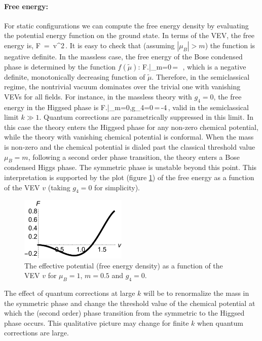  \paragraph{Free energy:} For static configurations  we can compute the free energy density by evaluating the potential energy function on the ground state.   In terms of the VEV, the free energy is,
 \be
F \,=\, v^2\,.
 \ee
 It is easy to check that (assuming $|\mu_B| > m$) the function is negative definite.
 In the massless case, the free energy of the Bose condensed phase is determined by the function $f(\tilde\mu)$:
 \be
 F\left.\right|_{m=0}\,=\, \,,
 \ee
 which is a negative definite, monotonically decreasing function of $\tilde\mu$. Therefore, in the semiclassical regime, the nontrivial vacuum dominates over the trivial one with vanishing VEVs for all fields. For instance, in the massless theory with $g_4=0$, the free energy in the Higgsed phase is
 \be
 F\left.\right|_{m=0,g_4=0}\,=\,-4\,,
 \ee
  valid in the semiclassical limit $k\gg 1$. Quantum corrections are parametrically suppressed in this limit. In this case the theory enters the Higgsed phase for any non-zero chemical potential, while the theory with vanishing chemical potential is conformal.   When the mass is non-zero and the chemical potential is dialed past the classical threshold value $\mu_B=m$, following a second order phase transition, the theory enters a Bose condensed Higgs phase.   The symmetric phase is unstable beyond this point. This interpretation is supported by the plot (figure \ref{fvsv}) of the free energy as a function of the VEV $v$ (taking $g_4=0$ for simplicity).
   \begin{figure}[h]
\begin{center}
\includegraphics[width=2in]{Chapter_3_Folder_1806.06976/figures/Fvsv.pdf}
\end{center}
       \caption[This figure shows the effective potential (free energy density) as a function of the VEV $v$ for $\mu_B=1$, $m=0.5$ and $g_4=0$.
]{ The effective potential (free energy density) as a function of the VEV $v$ for $\mu_B=1$, $m=0.5$ and $g_4=0$.
}
\label{fvsv}
\end{figure}
The effect of  quantum corrections at large $k$ will be to renormalize the mass  in the symmetric phase and change the threshold value of the chemical potential at which the (second order) phase transition from the symmetric to the Higgsed phase occurs. This qualitative picture may change for finite $k$ when quantum corrections are large.

